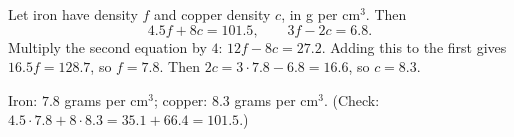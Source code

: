 Let iron have density $f$ and copper density $c$, in g per cm$^3$. Then
\[
4.5f+8c=101.5,\qquad 3f-2c=6.8 .
\]
Multiply the second equation by $4$: $12f-8c=27.2$. Adding this to the first gives $16.5f=128.7$, so $f=7.8$. Then $2c=3\cdot7.8-6.8=16.6$, so $c=8.3$.

Iron: $\boxed{7.8}$ grams per cm$^3$; copper: $\boxed{8.3}$ grams per cm$^3$. (Check: $4.5\cdot7.8+8\cdot8.3=35.1+66.4=101.5$.)

